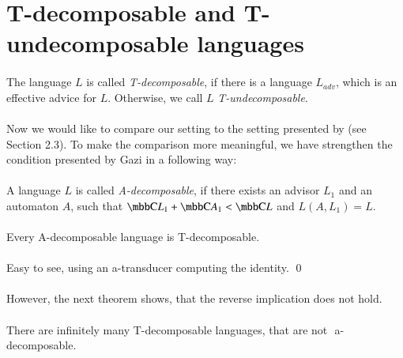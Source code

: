 \section{T-decomposable and T-undecomposable languages}

\paragraph{}
\cdefinicia The language $L$ is called \emph{T-decomposable}, if there is a language $L_{adv}$, which is an effective advice for $L$. Otherwise, we call $L$ \emph{T-undecomposable}.

\paragraph{}
Now we would like to compare our setting to the setting presented by \cite{Gazi} (see Section 2.3). To make the comparison more meaningful, we have strengthen the condition presented by Gazi in a following way:

\paragraph{}
\cdefinicia A language $L$ is called \emph{A-decomposable}, if there exists an advisor $L_1$ and an automaton $A$, such that $\C{L_1} + \C{A_1} < \C{L}$ and $L(A, L_1) = L$.

\paragraph{}
\cveta Every A-decomposable language is T-decomposable.

\paragraph{}
\dokaz Easy to see, using an a-transducer computing the identity. \qed

\paragraph{}
However, the next theorem shows, that the reverse implication does not hold.

\paragraph{}
\cveta There are infinitely many T-decomposable languages, that are not $\allowbreak$ a-decomposable.

